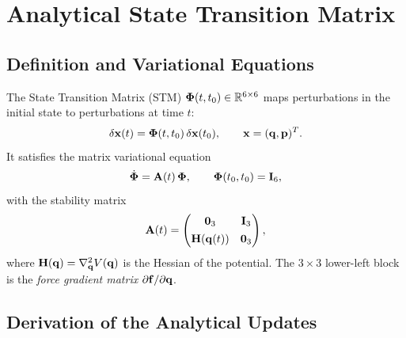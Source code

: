 
\section{Analytical State Transition Matrix}
\label{sec:stm}

\subsection{Definition and Variational Equations}
\label{sec:stm_def}

The State Transition Matrix (STM)
$\boldsymbol{\Phi}(t, t_0) \in \mathbb{R}^{6\times6}$ maps perturbations
in the initial state to perturbations at time $t$:
\begin{equation}
  \delta\mathbf{x}(t) = \boldsymbol{\Phi}(t, t_0)\,\delta\mathbf{x}(t_0),
  \qquad
  \mathbf{x} = (\mathbf{q}, \mathbf{p})^T.
  \label{eq:stm_def}
\end{equation}
It satisfies the matrix variational equation
\begin{equation}
  \dot{\boldsymbol{\Phi}} = \mathbf{A}(t)\,\boldsymbol{\Phi},
  \qquad
  \boldsymbol{\Phi}(t_0, t_0) = \mathbf{I}_6,
  \label{eq:stm_ode}
\end{equation}
with the stability matrix
\begin{equation}
  \mathbf{A}(t) =
  \begin{pmatrix}
    \mathbf{0}_3 & \mathbf{I}_3 \\[4pt]
    \mathbf{H}(\mathbf{q}(t)) & \mathbf{0}_3
  \end{pmatrix},
  \label{eq:A_matrix}
\end{equation}
where $\mathbf{H}(\mathbf{q}) = \nabla_{\mathbf{q}}^2 V(\mathbf{q})$ is the Hessian
of the potential. The $3\times3$ lower-left block is the
\textit{force gradient matrix} $\partial\mathbf{f}/\partial\mathbf{q}$.

\subsection{Derivation of the Analytical Updates}
\label{sec:stm_derivation}

